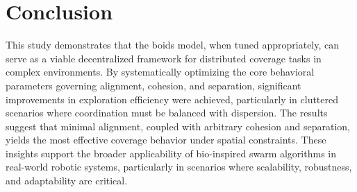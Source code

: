 \documentclass[12pt]{article}
\begin{document}
\section{Conclusion}

This study demonstrates that the boids model, when tuned appropriately, can serve as a viable decentralized framework for distributed coverage tasks in complex environments. By systematically optimizing the core behavioral parameters governing alignment, cohesion, and separation, significant improvements in exploration efficiency were achieved, particularly in cluttered scenarios where coordination must be balanced with dispersion. The results suggest that minimal alignment, coupled with arbitrary cohesion and separation, yields the most effective coverage behavior under spatial constraints. These insights support the broader applicability of bio-inspired swarm algorithms in real-world robotic systems, particularly in scenarios where scalability, robustness, and adaptability are critical.



\appendix
\end{document}
